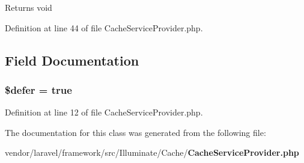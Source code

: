 \begin{DoxyReturn}{Returns}
void 
\end{DoxyReturn}


Definition at line 44 of file Cache\+Service\+Provider.\+php.



\subsection{Field Documentation}
\subsubsection[{\$defer}]{\setlength{\rightskip}{0pt plus 5cm}\$defer = true\hspace{0.3cm}{\ttfamily [protected]}}\label{class_illuminate_1_1_cache_1_1_cache_service_provider_af035ee3a0e66d50f2a013040b1d320b8}


Definition at line 12 of file Cache\+Service\+Provider.\+php.



The documentation for this class was generated from the following file\+:\begin{DoxyCompactItemize}
\item 
vendor/laravel/framework/src/\+Illuminate/\+Cache/{\bf Cache\+Service\+Provider.\+php}\end{DoxyCompactItemize}
